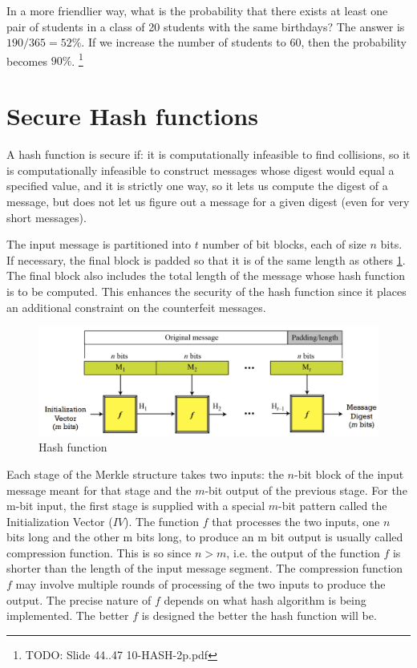 In a more friendlier way, what is the probability that there exists at least one pair of students in a class of 20 students with the same birthdays? The answer is $190/365 = 52\%$. If we increase the number of students to $60$, then the probability becomes $90\%$. \footnote{TODO: Slide 44..47 10-HASH-2p.pdf}

\section{Secure Hash functions}

A hash function is secure if: it is computationally infeasible to find collisions, so  it is computationally infeasible to construct messages whose digest would equal a specified value, and it is strictly one way, so it lets us compute the digest of a message, but does not let us figure out a message for a given digest (even for very short messages).

The input message is partitioned into $t$ number of bit blocks, each of size $n$ bits. If necessary, the final block is padded so that it is of the same length as others \ref{fig:merkle}. The final block also includes the total length of the message whose hash function is to be computed. This enhances the security of the hash function since it places an additional constraint on the counterfeit messages.

\begin{figure}
	\centering
	\includegraphics[width=0.7\linewidth]{Images/Chapter6/merkle}
	\caption{Hash function}
	\label{fig:merkle}
\end{figure}

Each stage of the Merkle structure takes two inputs: the $n$-bit block of the input message meant for that stage and the $m$-bit output of the previous stage. For the m-bit input, the first stage is supplied with a special $m$-bit pattern called the Initialization Vector ($IV$). The function $f$ that processes the two inputs, one $n$ bits long and the other m bits long, to produce an m bit output is usually called compression function. This is so since $n > m$, i.e. the output of the function $f$ is shorter than the length of the input message segment. The compression function $f$ may involve multiple rounds of processing of the two inputs to produce the output. The precise nature of $f$ depends on what hash algorithm is being implemented. The better $f$ is designed the better the hash function will be.

